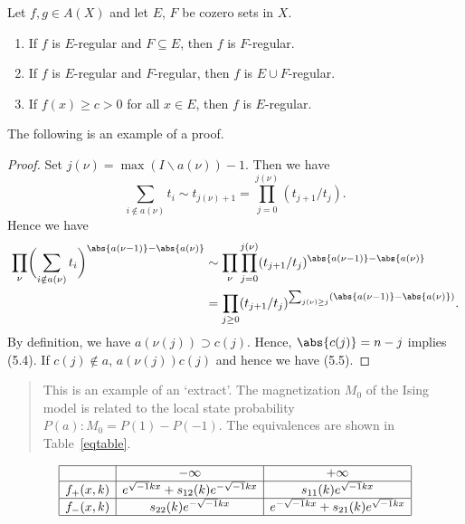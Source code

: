 \begin{lemma}
Let $f, g\in  A(X)$ and let $E$, $F$ be cozero
sets in $X$.
\begin{enumerate}
\item If $f$ is $E$-regular and $F\subseteq E$, then $f$ is $F$-regular.

\item If $f$ is $E$-regular and $F$-regular, then $f$ is $E\cup
F$-regular.

\item If $f(x)\ge c>0$ for all $x\in E$, then $f$ is $E$-regular.

\end{enumerate}
\end{lemma}

The following is an example of a proof.

\begin{proof} Set $j(\nu)=\max(I\backslash a(\nu))-1$. Then we have
\[
\sum_{i\notin a(\nu)}t_i\sim t_{j(\nu)+1}
  =\prod^{j(\nu)}_{j=0}(t_{j+1}/t_j).
\]
Hence we have
\begin{equation}
\begin{split}
\prod_\nu\biggl(\sum_{i\notin
  a(\nu)}t_i\biggr)^{\abs{a(\nu-1)}-\abs{a(\nu)}}
&\sim\prod_\nu\prod^{j(\nu)}_{j=0}
  (t_{j+1}/t_j)^{\abs{a(\nu-1)}-\abs{a(\nu)}}\\
&=\prod_{j\ge 0}(t_{j+1}/t_j)^{
  \sum_{j(\nu)\ge j}(\abs{a(\nu-1)}-\abs{a(\nu)})}.
\end{split}
\end{equation}
By definition, we have $a(\nu(j))\supset c(j)$. Hence, $\abs{c(j)}=n-j$
implies (5.4). If $c(j)\notin a$, $a(\nu(j))c(j)$ and hence
we have (5.5).
\end{proof}

\begin{quotation}
This is an example of an `extract'. The magnetization $M_0$ of the Ising
model is related to the local state probability $P(a):M_0=P(1)-P(-1)$.
The equivalences are shown in Table~\ref{eqtable}.
\end{quotation}

\begin{table}[ht]
\caption{}\label{eqtable}
\renewcommand\arraystretch{1.5}
\noindent\[
\begin{array}{|c|c|c|}
\hline
&{-\infty}&{+\infty}\\
\hline
{f_+(x,k)}&e^{\sqrt{-1}kx}+s_{12}(k)e^{-\sqrt{-1}kx}&s_{11}(k)e^
{\sqrt{-1}kx}\\
\hline
{f_-(x,k)}&s_{22}(k)e^{-\sqrt{-1}kx}&e^{-\sqrt{-1}kx}+s_{21}(k)e^{\sqrt
{-1}kx}\\
\hline
\end{array}
\]
\end{table}

